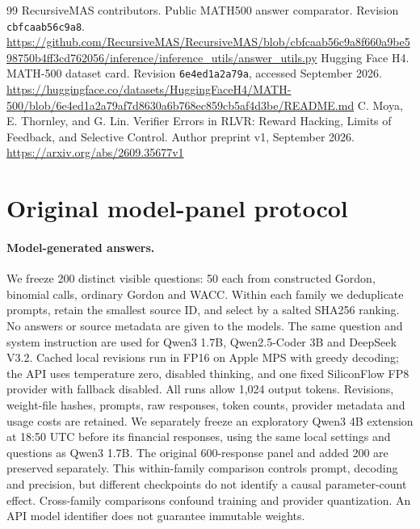 \begin{thebibliography}{99}
 RecursiveMAS contributors. Public MATH500 answer comparator. Revision \texttt{cbfcaab56c9a8}. \url{https://github.com/RecursiveMAS/RecursiveMAS/blob/cbfcaab56c9a8f660a9be598750b4ff3cd762056/inference/inference_utils/answer_utils.py}
 Hugging Face H4. MATH-500 dataset card. Revision \texttt{6e4ed1a2a79a}, accessed September 2026. \url{https://huggingface.co/datasets/HuggingFaceH4/MATH-500/blob/6e4ed1a2a79af7d8630a6b768ec859cb5af4d3be/README.md}
 C. Moya, E. Thornley, and G. Lin. Verifier Errors in RLVR: Reward Hacking, Limits of Feedback, and Selective Control. Author preprint v1, September 2026. \url{https://arxiv.org/abs/2609.35677v1}
\end{thebibliography}
\clearpage
\appendix
\section{Original model-panel protocol}\label{app:synthetic-model-protocol}
\paragraph{Model-generated answers.} We freeze 200 distinct visible questions: 50 each from constructed Gordon, binomial calls, ordinary Gordon and WACC. Within
each family we deduplicate prompts, retain the smallest source ID, and select by a salted SHA256 ranking. No answers or source metadata are given to the models. The same question and system instruction are used
for Qwen3 1.7B, Qwen2.5-Coder 3B and DeepSeek V3.2. Cached local revisions run in FP16 on Apple MPS with greedy decoding; the API uses temperature zero, disabled thinking, and one fixed SiliconFlow FP8 provider
with fallback disabled. All runs allow 1,024 output tokens. Revisions, weight-file hashes, prompts, raw responses, token counts, provider metadata and usage costs are retained. We separately freeze an
exploratory Qwen3 4B extension at 18:50 UTC before its financial responses, using the same local settings and questions as Qwen3 1.7B. The original 600-response panel and added 200 are preserved separately.
This within-family comparison controls prompt, decoding and precision, but different checkpoints do not identify a causal parameter-count effect. Cross-family comparisons confound training and provider
quantization. An API model identifier does not guarantee immutable weights.

